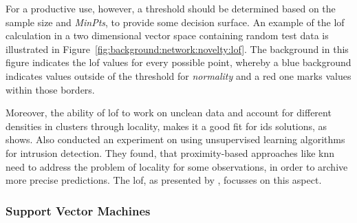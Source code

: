 For a productive use, however, a threshold should be determined based on the sample size and \emph{MinPts}, to provide some decision surface.
An example of the \gls{lof} calculation in a two dimensional vector space containing random test data is illustrated in Figure~\ref{fig:background:network:novelty:lof}.
The background in this figure indicates the \gls{lof} values for every possible point, whereby a blue background indicates values outside of the threshold for \emph{normality} and a red one marks values within those borders.

Moreover, the ability of \gls{lof} to work on unclean data and account for different densities in clusters through locality, makes it a good fit for \gls{ids} solutions, as \textcite{Lazarevic2003} shows.
Also \textcite{Zanero2004} conducted an experiment on using unsupervised learning algorithms for intrusion detection. They found, that proximity-based approaches like \gls{knn} need to address the problem of locality for some observations, in order to archive more precise predictions. The \gls{lof}, as presented by \textcite{Breunig2000}, focusses on this aspect.

\subsubsection{Support Vector Machines}
\label{sec:background:network:novelty:svm}

